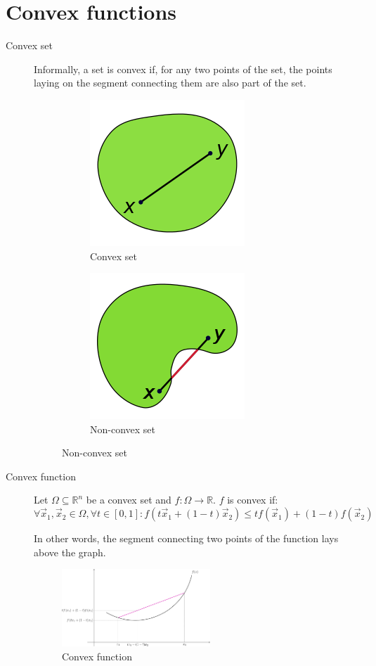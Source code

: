 \section{Convex functions}

\begin{description}
    \item[Convex set] 
        Informally, a set is convex if, for any two points of the set,
        the points laying on the segment connecting them are also part of the set.

        \begin{figure}[H]
            \begin{subfigure}{.5\textwidth}
                \centering
                \includegraphics[width=.25\linewidth]{img/convex_set.png}
                \caption{Convex set}
            \end{subfigure}%
            \begin{subfigure}{.5\textwidth}
                \centering
                \includegraphics[width=.25\linewidth]{img/non_convex_set.png}
                \caption{Non-convex set}
            \end{subfigure}
        \end{figure}

    \item[Convex function] 
        Let $\Omega \subseteq \mathbb{R}^n$ be a convex set and $f: \Omega \rightarrow \mathbb{R}$.
        $f$ is convex if:
        \[ 
            \forall \vec{x}_1, \vec{x}_2 \in \Omega, \forall t \in [0, 1]: 
                f(t\vec{x}_1 + (1-t)\vec{x}_2) \leq t f(\vec{x}_1) + (1-t) f(\vec{x}_2)
        \]

        In other words, the segment connecting two points of the function lays above the graph.
        \begin{figure}[H]
            \centering
            \includegraphics[width=0.55\textwidth]{img/convex_function.png}
            \caption{Convex function}
        \end{figure}


\end{description}
